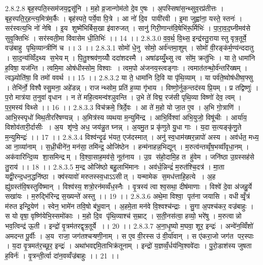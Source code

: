 2.8.2.8
बृह॒स्पति॒स्सम॑जय॒द्वसू॑नि । म॒हो व्र॒जान्गोम॑तो दे॒व ए॒षः । अ॒पस्सिषा॑स॒न्थ्सुव॒रप्र॑तीत्तः । बृह॒स्पति॒र्॒हन्त्य॒मित्र॑म॒र्कैः । बृह॑स्पते॒ पर्ये॒वा पि॒त्रे । आ नो॑ दि॒व पावी॑रवी । इ॒मा जुह्वा॑ना॒ यस्ते॒ स्तनः॑ । सर॑स्वत्य॒भि नो॑ नेषि । इ॒य शुष्मे॑भिर्बिस॒खा इ॑वारुजत् । सानु॑ गिरी॒णान्त॑वि॒षेभि॑रू॒र्मिभिः॑ । पा॒रा॒व॒द॒घ्नीमव॑से सुवृ॒क्तिभिः॑ । सर॑स्वती॒मा वि॑वासेम धी॒तिभिः॑ ।। 14 ।।
2.8.3.0
व॒व॒र्थ॒ वि॒थ्स॒ इन्द्र॑स्तु॒रायास्तु वृत्र॒तूर्ये॒ वज्र॑बाहु पृथि॒व्यान्त्रीणि॑ च ।। 3 ।।
2.8.3.1
सोमो॑ धे॒नु सोमो॒ अर्व॑न्तमा॒शुम् । सोमो॑ वी॒रङ्क॑र्म॒ण्य॑न्ददातु । सा॒द॒न्य॑व्विँद॒थ्य॑ स॒भेयम् । पि॒तु॒श्श्रव॑ण॒य्योँ ददा॑शदस्मै । अषा॑ढय्युँ॒थ्सु त्व सो॑म॒ क्रतु॑भिः । या ते॒ धामा॑नि ह॒विषा॒ यज॑न्ति । त्वमि॒मा ओष॑धीस्सोम॒ विश्वाः । त्वम॒पो अ॑जनय॒स्त्वङ्गाः । त्वमात॑तन्थो॒र्व॑न्तरि॑ख्षम् । त्वञ्ज्योति॑षा॒ वि तमो॑ ववर्थ ।। 15 ।।
2.8.3.2
या ते॒ धामा॑नि दि॒वि या पृ॑थि॒व्याम् । या पर्व॑ते॒ष्वोष॑धीष्व॒फ्सु । तेभि॑र्नो॒ विश्वैस्सु॒मना॒ अहे॑डन्न् । राजन्थ्सोम॒ प्रति॑ ह॒व्या गृ॑भाय । विष्णो॒र्नुक॒न्तद॑स्य प्रि॒यम् । प्र तद्विष्णुः॑ । प॒रो मात्र॑या त॒नुवा॑ वृधान । न ते॑ महि॒त्वमन्व॑श्ञुवन्ति । उ॒भे ते॑ विद्म॒ रज॑सी पृथि॒व्या विष्णो॑ देव॒ त्वम् । प॒र॒मस्य॑ विथ्से ।। 16 ।।
2.8.3.3
विच॑क्रमे॒ त्रिर्दे॒वः । आ ते॑ म॒हो यो जा॒त ए॒व । अ॒भि गो॒त्राणि॑ । आभि॒स्स्पृधो॑ मिथ॒तीररि॑षण्यन्न् । अ॒मित्र॑स्य व्यथया म॒न्युमि॑न्द्र । आभि॒र्विश्वा॑ अभि॒युजो॒ विषू॑चीः । आर्या॑य॒ विशोव॑तारी॒र्दासीः । अ॒य शृ॑ण्वे॒ अध॒ जय॑न्नु॒त घ्नन्न् । अ॒यमु॒त प्र कृ॑णुते यु॒धा गाः । य॒दा स॒त्यङ्कृ॑णु॒ते म॒न्युमिन्द्रः॑ ।। 17 ।।
2.8.3.4
विश्व॑न्दृ॒ढं भ॑यत॒ एज॑दस्मात् । अनु॑ स्व॒धाम॑ख्षर॒न्नापो॑ अस्य । अव॑र्धत॒ मध्य॒ आ ना॒व्या॑नाम् । स॒ध्री॒चीने॑न॒ मन॑सा॒ तमि॑न्द्र॒ ओजि॑ष्ठेन । हन्म॑नाहन्न॒भिद्यून् । म॒रुत्व॑न्तव्वृँष॒भव्वाँ॑वृधा॒नम् । अक॑वारिन्दि॒व्य शा॒समिन्द्रम् । वि॒श्वा॒साह॒मव॑से॒ नूत॑नाय । उ॒ग्र स॑हो॒दामि॒ह त हु॑वेम । जनि॑ष्ठा उ॒ग्रस्सह॑से तु॒राय॑ ।। 18 ।।
2.8.3.5
म॒न्द्र ओजि॑ष्ठो बहु॒लाभि॑मानः । अव॑र्ध॒न्निन्द्रं॑ म॒रुत॑श्चि॒दत्र॑ । मा॒ता यद्वी॒रन्द॒धन॒द्धनि॑ष्ठा । क्व॑स्यावो॑ मरुतस्स्व॒धाऽऽसीत् । यन्मामेक॑ स॒मध॑त्ताहि॒हत्ये । अ॒ह ह्यु॑ग्रस्त॑वि॒षस्तुवि॑ष्मान् । विश्व॑स्य॒ शत्रो॒रन॑मव्वँध॒स्नैः । वृ॒त्रस्य॑ त्वा श्व॒सथा॒ दीष॑माणाः । विश्वे॑ दे॒वा अ॑जहु॒र्ये सखा॑यः । म॒रुद्भि॑रिन्द्र स॒ख्यन्ते॑ अस्तु ।। 19 ।।
2.8.3.6
अथे॒मा विश्वा॒ पृत॑ना जयासि । वधीव्वृँ॒त्रं म॑रुत इन्द्रि॒येण॑ । स्वेन॒ भामे॑न तवि॒षो ब॑भू॒वान् । अ॒हमे॒ता मन॑वे वि॒श्वश्च॑न्द्राः । सु॒गा अ॒पश्च॑कर॒ वज्र॑बाहुः । स यो वृषा॒ वृष्णि॑येभि॒स्समो॑काः । म॒हो दि॒व पृ॑थि॒व्याश्च॑ स॒म्राट् । स॒ती॒नस॑त्वा॒ हव्यो॒ भरे॑षु । म॒रुत्वान्नो भव॒त्विन्द्र॑ ऊ॒ती । इन्द्रो॑ वृ॒त्रम॑तरद्वृत्र॒तूर्ये ।। 20 ।।
2.8.3.7
अ॒ना॒धृ॒ष्यो म॒घवा॒ शूर॒ इन्द्रः॑ । अन्वे॑न॒व्विँशो॑ अमदन्त पू॒र्वीः । अ॒य राजा॒ जग॑तश्चऱ्षणी॒नाम् । स ए॒व वी॒रस्स उ॑ वी॒र्या॑वान् । स ए॑करा॒जो जग॑त पर॒स्पाः । य॒दा वृ॒त्रमत॑र॒च्छूर॒ इन्द्रः॑ । अथा॑भवद्दमि॒ताभिक्र॑तूनाम् । इन्द्रो॑ य॒ज्ञव्वँ॒र्धय॑न्वि॒श्ववे॑दाः । पु॒रो॒डाश॑स्य जुषता ह॒विर्नः॑ । वृ॒त्रन्ती॒र्त्वा दा॑न॒वव्वँज्र॑बाहुः ।। 21 ।।
